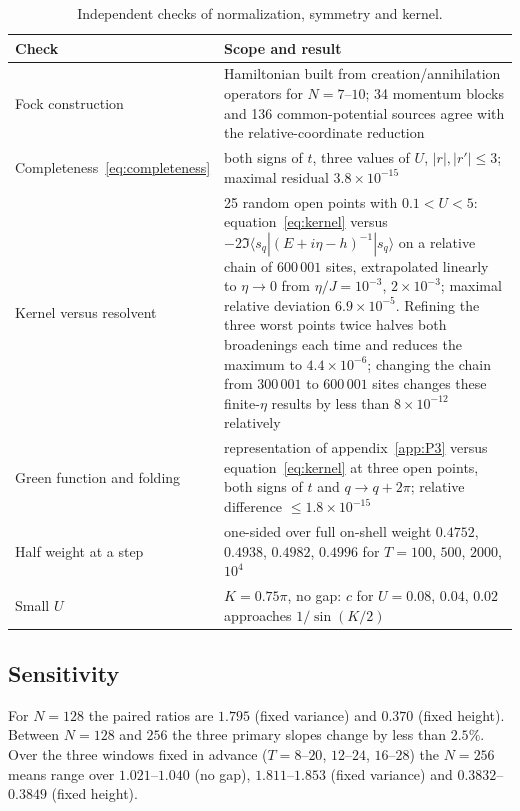 \documentclass[12pt,a4paper]{article}
\theoremstyle{remark}
\begin{document}
\begin{table}[htbp]
\centering
\caption{Independent checks of normalization, symmetry and kernel.}
\label{tab:checks}
\begin{tabular}{@{}L{0.26\textwidth}L{0.66\textwidth}@{}}
\toprule
Check & Scope and result\\
\midrule
Fock construction & Hamiltonian built from creation/annihilation operators for $N=7$--$10$; 34 momentum blocks and 136 common-potential sources agree with the relative-coordinate reduction\\
Completeness~\eqref{eq:completeness} & both signs of $t$, three values of $U$, $|r|,|r'|\le3$; maximal residual $3.8\times10^{-15}$\\
Kernel versus resolvent & 25 random open points with $0.1<U<5$: equation~\eqref{eq:kernel} versus $-2\Im\langle s_q|(E+i\eta-h)^{-1}|s_q\rangle$ on a relative chain of $600\,001$ sites, extrapolated linearly to $\eta\to0$ from $\eta/J=10^{-3}$, $2\times10^{-3}$; maximal relative deviation $6.9\times10^{-5}$. Refining the three worst points twice halves both broadenings each time and reduces the maximum to $4.4\times10^{-6}$; changing the chain from $300\,001$ to $600\,001$ sites changes these finite-$\eta$ results by less than $8\times10^{-12}$ relatively\\
Green function and folding & representation of appendix~\ref{app:P3} versus equation~\eqref{eq:kernel} at three open points, both signs of $t$ and $q\to q+2\pi$; relative difference $\le1.8\times10^{-15}$\\
Half weight at a step & one-sided over full on-shell weight $0.4752$, $0.4938$, $0.4982$, $0.4996$ for $T=100$, $500$, $2000$, $10^4$\\
Small $U$ & $K=0.75\pi$, no gap: $c$ for $U=0.08$, $0.04$, $0.02$ approaches $1/\sin(K/2)$\\
\bottomrule
\end{tabular}
\end{table}

\subsection{Sensitivity}

For $N=128$ the paired ratios are $1.795$ (fixed variance) and $0.370$ (fixed height). Between $N=128$ and $256$ the three primary slopes change by less than $2.5\%$. Over the three windows fixed in advance ($T=8$--$20$, $12$--$24$, $16$--$28$) the $N=256$ means range over $1.021$--$1.040$ (no gap), $1.811$--$1.853$ (fixed variance) and $0.3832$--$0.3849$ (fixed height).
\end{document}
